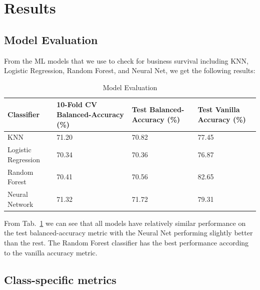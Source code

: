 \documentclass{article}
\begin{document}
\section{Results}

\subsection{Model Evaluation}

From the ML models that we use to check for business survival including KNN, Logistic Regression, Random Forest, and Neural Net, we get the following results:

\begin{table}[hbpt]
\begin{tabular}{p{4cm}|p{4cm}|p{3.5cm} |p{3.5cm} } 
 \hline

 Classifier & 10-Fold CV Balanced-Accuracy (\%) & Test Balanced-Accuracy (\%) & Test Vanilla Accuracy (\%)\\
 \hline
 KNN   & 71.20  &  70.82 &  77.45\\
 Logistic Regression  & 70.34 & 70.36  & 76.87 \\
 Random Forest & 70.41 & 70.56  & 82.65 \\
 Neural Network  & 71.32 & 71.72  & 79.31 \\
 \hline

\end{tabular}
  \caption{Model Evaluation} 
  \vspace{-2ex}
  \label{tab:table1x}
\end{table}



From Tab.~\ref{tab:table1x} we can see that all models have relatively similar performance on the test balanced-accuracy metric with the Neural Net performing slightly better than the rest. The Random Forest classifier has the best performance according to the vanilla accuracy metric.

\subsection{Class-specific metrics} 
\end{document}
